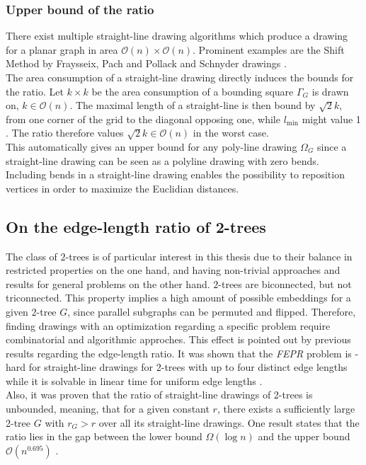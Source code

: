 \subsubsection{Upper bound of the ratio}
There exist multiple straight-line drawing algorithms which produce a drawing for a planar graph in area $\mathcal{O}(n)\times\mathcal{O}(n)$. Prominent examples are the Shift Method by Fraysseix, Pach and Pollack \cite [P. 202ff]{Planar_straight_line_drawing_algorithms} and Schnyder drawings \cite[P. 3]{Schnyder_drawings}.\\
The area consumption of a straight-line drawing directly induces the bounds for the ratio. Let $k\times k$ be the area consumption of a bounding square $\Gamma_G$ is drawn on, $k\in \mathcal{O}(n)$. The maximal length of a straight-line is then bound by $\sqrt{2}k$, from one corner of the grid to the diagonal opposing one, while $l_{\min}$ might value 1 \UL. The ratio therefore values $\sqrt{2}k \in \mathcal{O}(n)$ in the worst case.\\
This automatically gives an upper bound for any poly-line drawing $\Omega_G$ since a straight-line drawing can be seen as a polyline drawing with zero bends. Including bends in a straight-line drawing enables the possibility to reposition vertices in order to maximize the Euclidian distances.


\subsection{On the edge-length ratio of 2-trees}

The class of $2$-trees is of particular interest in this thesis due to their balance in restricted properties on the one hand, and having non-trivial approaches and results for general problems on the other hand. $2$-trees are biconnected, but not triconnected. This property implies a high amount of possible embeddings for a given $2$-tree $G$, since parallel subgraphs can be permuted and flipped. Therefore, finding drawings with an optimization regarding a specific problem require combinatorial and algorithmic approches. This effect is pointed out by previous results regarding the edge-length ratio. It was shown that the \emph{FEPR} problem is \NP-hard for straight-line drawings for 2-trees with up to four distinct edge lengths while it is solvable in linear time for uniform edge lengths \cite[P. 1]{straight-line_2-trees}.\\
Also, it was proven that the ratio of straight-line drawings of 2-trees is unbounded, meaning, that for a given constant $r$, there exists a sufficiently large 2-tree $G$ with $r_G > r$ over all its straight-line drawings. One result states that the ratio lies in the gap between the lower bound $\Omega(\log n)$ and the upper bound $\mathcal{O}(n^{0.695})$ \cite[P. 2]{edge-length-ratio-2tree}.

